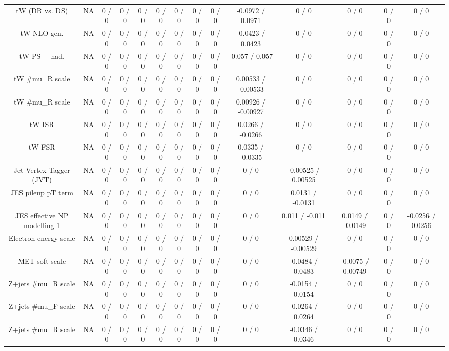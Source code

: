 \documentclass[10pt]{article}
\begin{document}
\begin{table}[htbp]
\begin{center}
\begin{tabular}{|c|c|c|c|c|c|c|c|c|c|c|c|c|c|}
  tW (DR vs. DS) &    NA    & 0 / 0 & 0 / 0 & 0 / 0 & 0 / 0 & 0 / 0 & 0 / 0 & 0 / 0 & -0.0972 / 0.0971 & 0 / 0 & 0 / 0 & 0 / 0 & 0 / 0 \\ 
  tW NLO gen. &    NA    & 0 / 0 & 0 / 0 & 0 / 0 & 0 / 0 & 0 / 0 & 0 / 0 & 0 / 0 & -0.0423 / 0.0423 & 0 / 0 & 0 / 0 & 0 / 0 & 0 / 0 \\ 
  tW PS + had. &    NA    & 0 / 0 & 0 / 0 & 0 / 0 & 0 / 0 & 0 / 0 & 0 / 0 & 0 / 0 & -0.057 / 0.057 & 0 / 0 & 0 / 0 & 0 / 0 & 0 / 0 \\ 
  tW #mu_{R} scale &    NA    & 0 / 0 & 0 / 0 & 0 / 0 & 0 / 0 & 0 / 0 & 0 / 0 & 0 / 0 & 0.00533 / -0.00533 & 0 / 0 & 0 / 0 & 0 / 0 & 0 / 0 \\ 
  tW #mu_{R} scale &    NA    & 0 / 0 & 0 / 0 & 0 / 0 & 0 / 0 & 0 / 0 & 0 / 0 & 0 / 0 & 0.00926 / -0.00927 & 0 / 0 & 0 / 0 & 0 / 0 & 0 / 0 \\ 
  tW ISR &    NA    & 0 / 0 & 0 / 0 & 0 / 0 & 0 / 0 & 0 / 0 & 0 / 0 & 0 / 0 & 0.0266 / -0.0266 & 0 / 0 & 0 / 0 & 0 / 0 & 0 / 0 \\ 
  tW FSR &    NA    & 0 / 0 & 0 / 0 & 0 / 0 & 0 / 0 & 0 / 0 & 0 / 0 & 0 / 0 & 0.0335 / -0.0335 & 0 / 0 & 0 / 0 & 0 / 0 & 0 / 0 \\ 
  Jet-Vertex-Tagger (JVT) &    NA    & 0 / 0 & 0 / 0 & 0 / 0 & 0 / 0 & 0 / 0 & 0 / 0 & 0 / 0 & 0 / 0 & -0.00525 / 0.00525 & 0 / 0 & 0 / 0 & 0 / 0 \\ 
  JES pileup pT term &    NA    & 0 / 0 & 0 / 0 & 0 / 0 & 0 / 0 & 0 / 0 & 0 / 0 & 0 / 0 & 0 / 0 & 0.0131 / -0.0131 & 0 / 0 & 0 / 0 & 0 / 0 \\ 
  JES effective NP modelling 1 &    NA    & 0 / 0 & 0 / 0 & 0 / 0 & 0 / 0 & 0 / 0 & 0 / 0 & 0 / 0 & 0 / 0 & 0.011 / -0.011 & 0.0149 / -0.0149 & 0 / 0 & -0.0256 / 0.0256 \\ 
  Electron energy scale &    NA    & 0 / 0 & 0 / 0 & 0 / 0 & 0 / 0 & 0 / 0 & 0 / 0 & 0 / 0 & 0 / 0 & 0.00529 / -0.00529 & 0 / 0 & 0 / 0 & 0 / 0 \\ 
  MET soft scale &    NA    & 0 / 0 & 0 / 0 & 0 / 0 & 0 / 0 & 0 / 0 & 0 / 0 & 0 / 0 & 0 / 0 & -0.0484 / 0.0483 & -0.0075 / 0.00749 & 0 / 0 & 0 / 0 \\ 
  Z+jets #mu_{R} scale &    NA    & 0 / 0 & 0 / 0 & 0 / 0 & 0 / 0 & 0 / 0 & 0 / 0 & 0 / 0 & 0 / 0 & -0.0154 / 0.0154 & 0 / 0 & 0 / 0 & 0 / 0 \\ 
  Z+jets #mu_{F} scale &    NA    & 0 / 0 & 0 / 0 & 0 / 0 & 0 / 0 & 0 / 0 & 0 / 0 & 0 / 0 & 0 / 0 & -0.0264 / 0.0264 & 0 / 0 & 0 / 0 & 0 / 0 \\ 
  Z+jets #mu_{R} scale &    NA    & 0 / 0 & 0 / 0 & 0 / 0 & 0 / 0 & 0 / 0 & 0 / 0 & 0 / 0 & 0 / 0 & -0.0346 / 0.0346 & 0 / 0 & 0 / 0 & 0 / 0 \\ 

\end{tabular}
\end{center}
\end{table}
\end{document}
